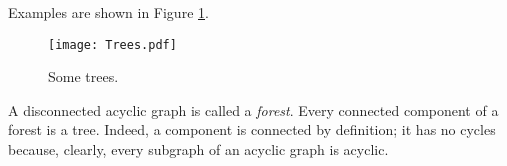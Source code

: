 

\setcounter{section}{2}
\setcounter{subsection}{1}
\setcounter{dfn}{1}

Examples are shown in Figure \ref{fig:Trees}.

\begin{figure}[ht]
\begin{center}
\texttt{[image: Trees.pdf]}
\end{center}
\caption{Some trees.}
\label{fig:Trees}
\end{figure}

A disconnected acyclic graph is called a \emph{forest}.
Every connected component of a forest is a tree.
Indeed, a component is connected by definition; it has no cycles because, clearly, every subgraph of an acyclic graph is acyclic.




